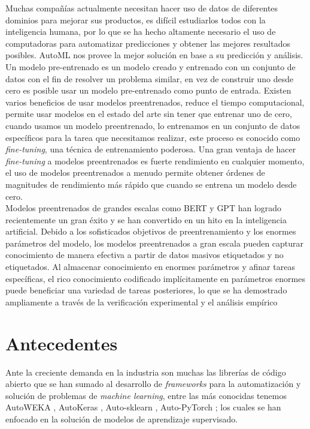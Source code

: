  Muchas compañías actualmente necesitan hacer uso de datos de diferentes dominios para mejorar sus productos, es difícil estudiarlos todos con la inteligencia humana, por lo que se ha hecho altamente necesario el uso de computadoras para automatizar predicciones y obtener las mejores resultados posibles. AutoML nos provee la mejor solución en base a su predicción y análisis.\\

Un modelo pre-entrenado es un modelo creado y entrenado con un conjunto de datos con el fin de resolver un problema similar, en vez de construir uno desde cero es posible usar un modelo pre-entrenado como punto de entrada. Existen varios beneficios de usar modelos preentrenados, reduce el tiempo computacional, permite usar modelos en el estado del arte sin tener que entrenar uno de cero, cuando usamos un modelo preentrenado, lo entrenamos en un conjunto de datos específicos para la tarea que necesitamos realizar, este proceso es conocido como \textit{fine-tuning}, una técnica de entrenamiento poderosa. Una gran ventaja de hacer \textit{fine-tuning} a modelos preentrenados es fuerte rendimiento en cualquier momento, el uso de modelos preentrenados a menudo permite obtener órdenes de magnitudes de rendimiento más rápido que cuando se entrena un modelo desde cero. \\

Modelos preentrenados de grandes escalas como BERT \parencite{11} y GPT \parencite{12} han logrado recientemente un gran éxito y se han convertido en un hito en la inteligencia artificial. Debido a los sofisticados objetivos de preentrenamiento y los enormes parámetros del modelo, los modelos preentrenados a gran escala pueden capturar conocimiento de manera efectiva a partir de datos masivos etiquetados y no etiquetados. Al almacenar conocimiento en enormes parámetros y afinar tareas específicas, el rico conocimiento codificado implícitamente en parámetros enormes puede beneficiar una variedad de tareas posteriores, lo que se ha demostrado ampliamente a través de la verificación experimental y el análisis empírico \\

\section*{Antecedentes}
Ante la creciente demanda en la industria son muchas las librerías de código abierto que se han sumado al desarrollo de \textit{frameworks} para la automatización y solución de problemas de \textit{machine learning}, entre las más conocidas tenemos AutoWEKA \parencite{13}, AutoKeras \parencite{14}, Auto-sklearn \parencite{15}, Auto-PyTorch \parencite{16}; los cuales se han enfocado en la solución de modelos de aprendizaje supervisado.\\

